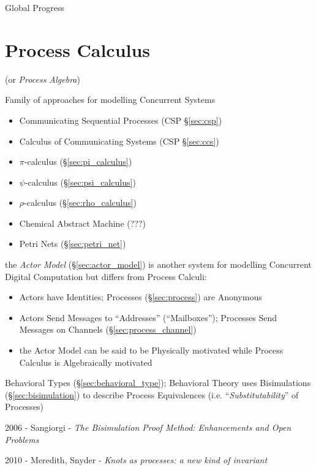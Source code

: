 Global Progress



\section{Process Calculus}\label{sec:process_calculus}

(or \emph{Process Algebra})

Family of approaches for modelling Concurrent Systems

\begin{itemize}
\item Communicating Sequential Processes (CSP \S\ref{sec:csp})
\item Calculus of Communicating Systems (CSP \S\ref{sec:ccs})
\item $\pi$-calculus (\S\ref{sec:pi_calculus})
\item $\psi$-calculus (\S\ref{sec:psi_calculus})
\item $\rho$-calculus (\S\ref{sec:rho_calculus})
\item Chemical Abstract Machine (???)
\item Petri Nets (\S\ref{sec:petri_net})
\end{itemize}

\fist the \emph{Actor Model} (\S\ref{sec:actor_model}) is
another system for modelling Concurrent Digital Computation but
differs from Process Calculi:
\begin{itemize}
  \item Actors have Identities; Processes (\S\ref{sec:process}) are
    Anonymous
  \item Actors Send Messages to ``Addresses'' (``Mailboxes'');
    Processes Send Messages on Channels (\S\ref{sec:process_channel})
  \item the Actor Model can be said to be Physically motivated while
    Process Calculus is Algebraically motivated
\end{itemize}

\fist Behavioral Types (\S\ref{sec:behavioral_type}); Behavioral
Theory uses Bisimulations (\S\ref{sec:bisimulation}) to describe
Process Equivalences (i.e. ``\emph{Substitutability}'' of Processes)

2006 - Sangiorgi - \emph{The Bisimulation Proof Method: Enhancements and Open
  Problems}

2010 - Meredith, Snyder - \emph{Knots as processes: a new kind of invariant}

